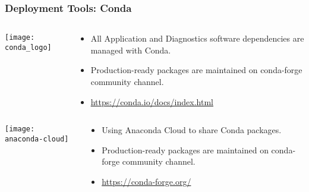 \documentclass{beamer}
\begin{document}
\begin{frame}
\frametitle<presentation>{Deployment Tools: Conda}

  \begin{columns}[c]
    \begin{column}{.2\textwidth}
      \texttt{[image: conda\_logo]}
    \end{column}
    \begin{column}{.8\textwidth}
      \begin{itemize}
        \item All Application and Diagnostics software dependencies are managed with Conda.
        \item Production-ready packages are maintained on conda-forge community channel.
        \item \footnotesize{\url{https://conda.io/docs/index.html}}
      \end{itemize}
    \end{column}
  \end{columns}
  \vrule
  \begin{columns}[c]
    \begin{column}{.2\textwidth}
      \texttt{[image: anaconda-cloud]}
    \end{column}
    \begin{column}{.8\textwidth}
      \begin{itemize}
        \item Using Anaconda Cloud to share Conda packages.
        \item Production-ready packages are maintained on conda-forge community channel.
        \item \footnotesize{\url{https://conda-forge.org/}}
      \end{itemize}
    \end{column}
  \end{columns}

\end{frame}
\end{document}

